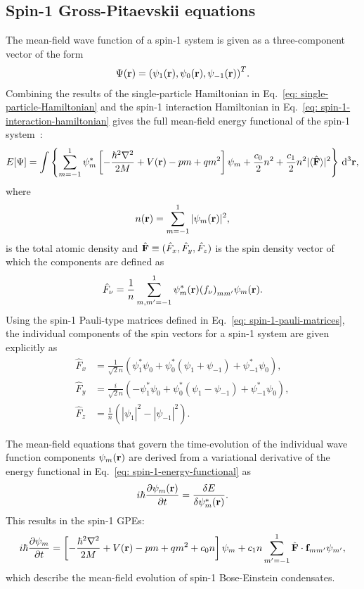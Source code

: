 \subsection{Spin-1 Gross-Pitaevskii equations}\label{subsec: spin-1-gpes}
The mean-field wave function of a spin-1 system is given as a three-component
vector of the form
\begin{align}
    \Psi(\vb{r}) = {(\psi_1(\vb{r}), \psi_0(\vb{r}), \psi_{-1}(\vb{r}))}^T.
\end{align}
Combining the results of the single-particle Hamiltonian in
Eq.~\eqref{eq: single-particle-Hamiltonian} and the spin-1 interaction
Hamiltonian in Eq.~\eqref{eq: spin-1-interaction-hamiltonian} gives the
full mean-field energy functional of the spin-1 system~\cite{Kawaguchi2012}:
\begin{align}\label{eq: spin-1-energy-functional}
    E[\Psi] = \int \left\{\sum_{m=-1}^1\psi_m^*\left[-\frac{\hbar^2\nabla^2}{2M}
    + V(\vb{r}) - pm + qm^2\right]\psi_m
    + \frac{c_0}{2}n^2 + \frac{c_1}{2}n^2|\langle \hat{\vb{F}} \rangle |^2 \right\} \, \dd^3\vb{r},
\end{align}
where
\begin{align}
    n(\vb{r}) = \sum_{m=-1}^1|\psi_m(\vb{r})|^2,
\end{align}
is the total atomic density and \(\hat{\vb{F}}\equiv(\hat{F}_x, \hat{F}_y,
\hat{F}_z)\) is the spin density vector of which the components are defined as
\begin{align}\label{eq: spin-vector-components}
    \hat{F}_\nu = \frac{1}{n} \sum_{m,m'=-1}^1 \psi^*_m(\vb{r}){(f_\nu)}_{mm'}
        \psi_m(\vb{r}).
\end{align}
Using the spin-1 Pauli-type matrices defined in
Eq.~\eqref{eq: spin-1-pauli-matrices}, the individual components of the spin
vectors for a spin-1 system are given explicitly as
\begin{align}\label{eq: spin-1-spin-vectors}
    \hat{F}_x &= \frac{1}{\sqrt{2}n} \left(\psi_1^*\psi_0
    + \psi_0^*(\psi_1+\psi_{-1}) + \psi_{-1}^*\psi_0\right), \\
    \hat{F}_y &= \frac{i}{\sqrt{2}n}\left(-\psi_1^*\psi_0
    + \psi_0^*(\psi_1-\psi_{-1}) +\psi_{-1}^*\psi_0\right), \\
    \hat{F}_z &= \frac{1}{n}\left(|\psi_1|^2-|\psi_{-1}|^2\right).
\end{align}

The mean-field equations that govern the time-evolution of the individual
wave function components \(\psi_m(\vb{r})\) are derived from a variational
derivative of the energy functional in Eq.~\eqref{eq: spin-1-energy-functional}
as
\begin{align}\label{eq: energy-variational}
    i\hbar\pdv{\psi_m(\vb{r})}{t} = \fdv{E}{\psi_m^*(\vb{r})}.
\end{align}
This results in the spin-1 GPEs:
\begin{equation}\label{eq: spin-1-GPEs}
    i\hbar \pdv{\psi_m}{t} = \left[-\frac{\hbar^2\nabla^2}{2M} + V(\vb{r})
        - pm + qm^2 + c_0n\right]\psi_m
    + c_1n\sum_{m'=-1}^{1}\hat{\vb{F}}\cdot \vb{f}_{mm'}\psi_{m'},
\end{equation}
which describe the mean-field evolution of spin-1 Bose-Einstein condensates.

